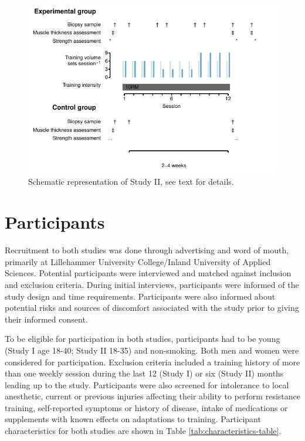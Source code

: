 \documentclass[twoside,10pt]{gihclass} %
\begin{document}
\begin{figure}

{\centering \includegraphics{thesis_files/figure-latex/study2-overview-1} 

}

\caption[Study II, schematic overview]{Schematic representation of Study II, see text for details.  }\label{fig:study2-overview}
\end{figure}
\hypertarget{participants}{%
\section{Participants}\label{participants}}

Recruitment to both studies was done through advertising and word of mouth, primarily at Lillehammer University College/Inland University of Applied Sciences. Potential participants were interviewed and matched against inclusion and exclusion criteria. During initial interviews, participants were informed of the study design and time requirements. Participants were also informed about potential risks and sources of discomfort associated with the study prior to giving their informed consent.

To be eligible for participation in both studies, participants had to be young (Study I age 18-40; Study II 18-35) and non-smoking. Both men and women were considered for participation. Exclusion criteria included a training history of more than one weekly session during the last 12 (Study I) or six (Study II) months leading up to the study. Participants were also screened for intolerance to local anesthetic, current or previous injuries affecting their ability to perform resistance training, self-reported symptoms or history of disease, intake of medications or supplements with known effects on adaptations to training.
Participant characteristics for both studies are shown in Table
\ref{tab:characteristics-table}.
\end{document}
